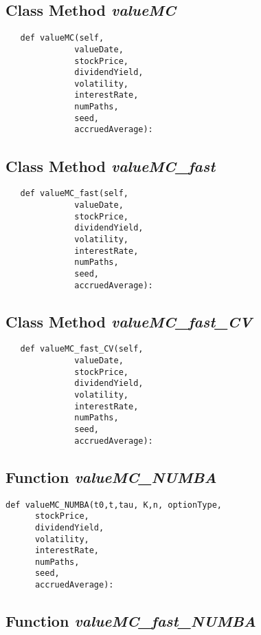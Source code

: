 \documentclass[twoside,11pt]{book}
\begin{document}
\subsection{Class Method {\it valueMC}}


\begin{lstlisting}
   def valueMC(self,
              valueDate,
              stockPrice,
              dividendYield,
              volatility,
              interestRate,
              numPaths,
              seed,
              accruedAverage):
\end{lstlisting}

\subsection{Class Method {\it valueMC\_fast}}


\begin{lstlisting}
   def valueMC_fast(self,
              valueDate,
              stockPrice,
              dividendYield,
              volatility,
              interestRate,
              numPaths,
              seed,
              accruedAverage):
\end{lstlisting}

\subsection{Class Method {\it valueMC\_fast\_CV}}


\begin{lstlisting}
   def valueMC_fast_CV(self,
              valueDate,
              stockPrice,
              dividendYield,
              volatility,
              interestRate,
              numPaths,
              seed,
              accruedAverage):
\end{lstlisting}

\subsection{Function {\it valueMC\_NUMBA}}


\begin{lstlisting}
def valueMC_NUMBA(t0,t,tau, K,n, optionType,
      stockPrice,
      dividendYield,
      volatility,
      interestRate,
      numPaths,
      seed,
      accruedAverage):
\end{lstlisting}

\subsection{Function {\it valueMC\_fast\_NUMBA}}
\end{document}
